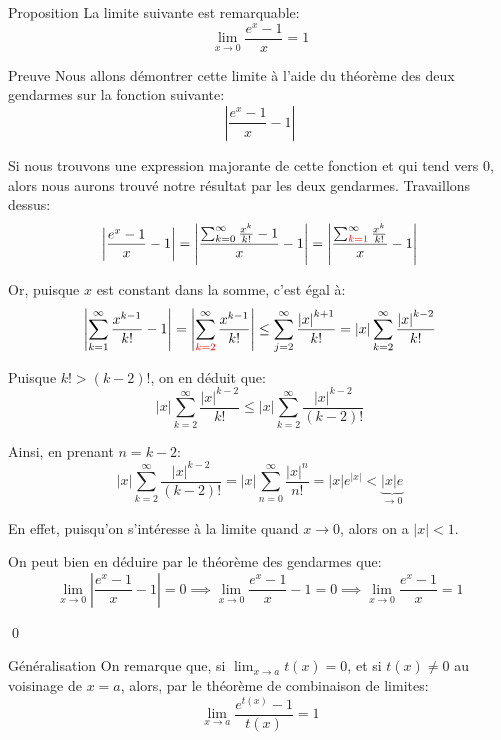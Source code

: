 \documentclass[a4paper]{article}
\begin{document}
\begin{parag}{Proposition}
    La limite suivante est remarquable: 
    \[\lim_{x \to 0} \frac{e^x - 1}{x} = 1\]
    
    \begin{subparag}{Preuve}
        Nous allons démontrer cette limite à l'aide du théorème des deux gendarmes sur la fonction suivante: 
        \[\left|\frac{e^x - 1}{x} - 1\right|\]
        
        Si nous trouvons une expression majorante de cette fonction et qui tend vers $0$, alors nous aurons trouvé notre résultat par les deux gendarmes. Travaillons dessus: 
        \[\left|\frac{e^x - 1}{x} - 1\right| = \left|\frac{\sum_{k=0}^{\infty} \frac{x^k}{k!} - 1}{x} - 1\right| = \left|\frac{\sum_{{\color{red}k=1}}^{\infty} \frac{x^k}{k!}}{x} - 1\right|\]
        
        Or, puisque $x$ est constant dans la somme, c'est égal à:
        \[\left|\sum_{k=1}^{\infty} \frac{x^{k-1}}{k!} - 1\right| = \left|\sum_{{\color{red}k=2}}^{\infty} \frac{x^{k-1}}{k!}\right| \leq \sum_{j=2}^{\infty} \frac{\left|x\right|^{k+1}}{k!} = \left|x\right|\sum_{k=2}^{\infty} \frac{\left|x\right|^{k-2}}{k!}\]

        Puisque $k! > \left(k-2\right)!$, on en déduit que: 
        \[\left|x\right|\sum_{k=2}^{\infty} \frac{\left|x\right|^{k-2}}{k!} \leq \left|x\right| \sum_{k=2}^{\infty} \frac{\left|x\right|^{k-2}}{\left(k-2\right)!}\]
        

        Ainsi, en prenant $n = k-2$:
        \[\left|x\right| \sum_{k=2}^{\infty} \frac{\left|x\right|^{k-2}}{\left(k-2\right)!} = \left|x\right|\sum_{n=0}^{\infty} \frac{\left|x\right|^{n}}{n!} = \left|x\right|e^{\left|x\right|} < \underbrace{\left|x\right|e}_{\to 0}\]

        En effet, puisqu'on s'intéresse à la limite quand $x \to 0$, alors on a $\left|x\right| < 1$. 

        On peut bien en déduire par le théorème des gendarmes que: 
        \[\lim_{x \to 0} \left|\frac{e^x - 1}{x} - 1\right| = 0 \implies \lim_{x \to 0} \frac{e^x - 1}{x} - 1 = 0 \implies \lim_{x \to 0} \frac{e^x - 1}{x} = 1\]

        \qed
    \end{subparag}

    \begin{subparag}{Généralisation}
        On remarque que, si $\lim_{x \to a} t\left(x\right) = 0$, et si $t\left(x\right) \neq 0$ au voisinage de $x = a$, alors, par le théorème de combinaison de limites: 
        \[\lim_{x \to a} \frac{e^{t\left(x\right)} - 1}{t\left(x\right)} = 1\]
    \end{subparag}


\end{parag}
\end{document}
